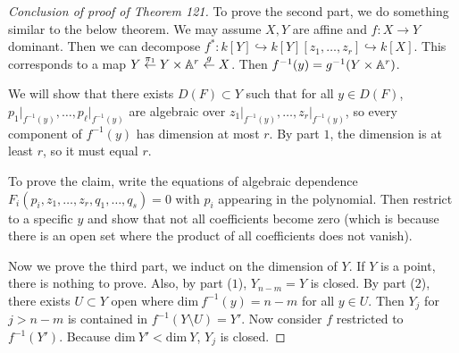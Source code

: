 \documentclass[twoside, 10pt]{article}
\begin{document}
    \begin{proof}[Conclusion of proof of Theorem 121]
        To prove the second part, we do something similar to the below theorem. We may assume $X,Y$ are affine and $f:X \to Y$ dominant. Then we can decompose $f^*:k[Y] \hookrightarrow k[Y][z_1, \ldots, z_r] \hookrightarrow k[X]$. This corresponds to a map $Y \overset{\pi_1}{\gets} Y \times \mathbb{A}^r \overset{g}{\gets} X$. Then $f^{-1}(y) = g^{-1}(Y \times \mathbb{A}^r)$.

        We will show that there exists $D(F) \subset Y$ such that for all $y \in D(F)$, $p_1\vert_{f^{-1}(y)}, \ldots, p_{\ell}\vert_{f^{-1}(y)}$ are algebraic over $z_1\vert_{f^{-1}(y)}, \ldots, z_r\vert_{f^{-1}(y)}$, so every component of $f^{-1}(y)$ has dimension at most $r$. By part $1$, the dimension is at least $r$, so it must equal $r$.

        To prove the claim, write the equations of algebraic dependence $F_i(p_i, z_1, \ldots, z_r, q_1, \ldots, q_s) = 0$ with $p_i$ appearing in the polynomial. Then restrict to a specific $y$ and show that not all coefficients become zero (which is because there is an open set where the product of all coefficients does not vanish).

        Now we prove the third part, we induct on the dimension of $Y$. If $Y$ is a point, there is nothing to prove. Also, by part ($1$), $Y_{n-m} = Y$ is closed. By part ($2$), there exists $U \subset Y$ open where $\mathrm{dim}\ f^{-1}(y) = n-m$ for all $y \in U$. Then $Y_j$ for $j > n-m$ is contained in $f^{-1}(Y \setminus U) = Y'$. Now consider $f$ restricted to $f^{-1}(Y')$. Because $\mathrm{dim}\ Y' < \mathrm{dim}\ Y$, $Y_j$ is closed.
    \end{proof}
\end{document}
